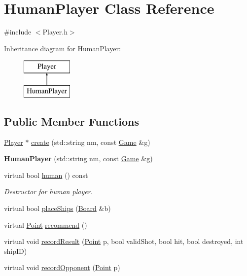 \hypertarget{class_human_player}{}\section{Human\+Player Class Reference}
\label{class_human_player}


{\ttfamily \#include $<$Player.\+h$>$}

Inheritance diagram for Human\+Player\+:\begin{figure}[H]
\begin{center}
\leavevmode
\includegraphics[height=2.000000cm]{class_human_player}
\end{center}
\end{figure}
\subsection*{Public Member Functions}
\begin{DoxyCompactItemize}
\item 
\mbox{\hyperlink{class_player}{Player}} $\ast$ \mbox{\hyperlink{class_human_player_ac369ccb03a62b40dcf3dc157841a965e}{create}} (std\+::string nm, const \mbox{\hyperlink{class_game}{Game}} \&g)
\item 
\mbox{\label{class_human_player_a443ff25b201959966555c0902a10e19c}} 
{\bfseries Human\+Player} (std\+::string nm, const \mbox{\hyperlink{class_game}{Game}} \&g)
\item 
\mbox{\label{class_human_player_acecbe621447504a013c2a763aaba05fa}} 
virtual bool \mbox{\hyperlink{class_human_player_acecbe621447504a013c2a763aaba05fa}{human}} () const
\begin{DoxyCompactList}\small\item\em Destructor for human player. \end{DoxyCompactList}\item 
virtual bool \mbox{\hyperlink{class_human_player_ae9315a3c66f6b2f2bf4d1ebb09669aff}{place\+Ships}} (\mbox{\hyperlink{class_board}{Board}} \&b)
\item 
virtual \mbox{\hyperlink{class_point}{Point}} \mbox{\hyperlink{class_human_player_a718f16f3ddeeb34c9f2e93cf1d805b46}{recommend}} ()
\item 
virtual void \mbox{\hyperlink{class_human_player_a19be81244b7a1c88a3ca89d207055b6e}{record\+Result}} (\mbox{\hyperlink{class_point}{Point}} p, bool valid\+Shot, bool hit, bool destroyed, int ship\+ID)
\item 
virtual void \mbox{\hyperlink{class_human_player_a16b18f42e02d7c8d1f0971ce5e91595f}{record\+Opponent}} (\mbox{\hyperlink{class_point}{Point}} p)
\end{DoxyCompactItemize}


